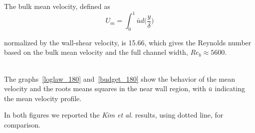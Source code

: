 The bulk mean velocity, defined as 
\begin{equation*}
U_{m} = \int_{0}^{1} \bar{u}d \big(\frac{y}{\delta} \big)
\end{equation*}

normalized by the wall-shear velocity, is 15.66, which gives the Reynolds number based on the bulk mean velocity and the full channel width, $Re_{b}\approx 5600$. \\~\par
The graphs~\ref{loglaw_180} and~\ref{budget_180} show the behavior of the mean velocity and the roots means squares in the near wall region, with $\bar{u}$ indicating the mean velocity profile. \par
In both figures we reported the \emph{Kim et al.} results, using dotted line, for comparison. \\~\par

